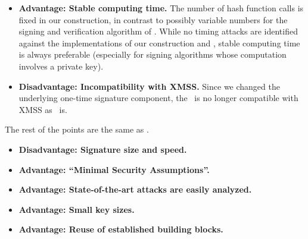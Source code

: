 
\begin{itemize}
    \item \textbf{Advantage: Stable computing time.} The number of hash function calls is fixed in our construction, in contrast to possibly variable numbers for the signing and verification algorithm of \WOTSP. While no timing attacks are identified against the implementations of our construction and \WOTSP, stable computing time is always preferable (especially for signing algorithms whose computation involves a private key). 

    \item \textbf{Disadvantage: Incompatibility with XMSS.} Since we changed the underlying one-time signature component, the \SPHINCSA\ is no longer compatible with XMSS as \SPHINCSP\ is.
\end{itemize}

The rest of the points are the same as \SPHINCSP.

\begin{itemize}
    \item \textbf{Disadvantage: Signature size and speed.}

    \item \textbf{Advantage: ``Minimal Security Assumptions''.}

    \item \textbf{Advantage: State-of-the-art attacks are easily analyzed.}

    \item \textbf{Advantage: Small key sizes.}

    \item \textbf{Advantage: Reuse of established building blocks.}
    
\end{itemize}
